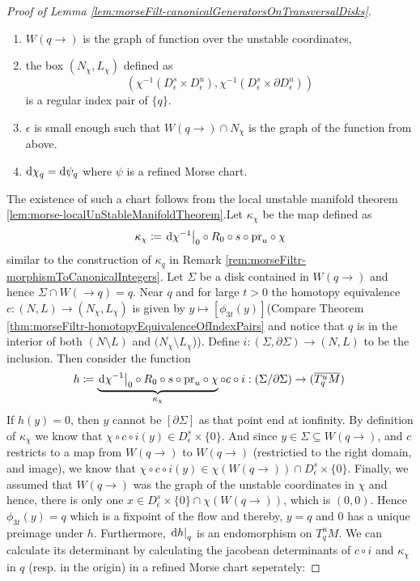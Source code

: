\begin{proof}[Proof of Lemma \ref{lem:morseFilt-canonicalGeneratorsOnTransversalDisks}]
	\begin{enumerate}
		\item $W(q\to)$ is the graph of function over the unstable coordinates,
		\item the box $(N_\chi,L_\chi)$ defined as 
	\begin{equation*}
		(\chi^{-1}(D^s_{\epsilon}\times D^u_{\epsilon}), \chi^{-1}(D^s_{\epsilon}\times \partial D^u_{\epsilon}))
	\end{equation*} is a regular index pair of $\{q\}$.
		\item $\epsilon$ is small enough such that $W(q\to)\cap N_\chi$ is the graph of the function from above.
		\item $\mathop{}\!\mathrm{d} \chi_q=\mathop{}\!\mathrm{d} \psi_q$ where $\psi$ is a refined Morse chart.
	\end{enumerate}
	 The existence of such a chart follows from the local unstable manifold theorem \ref{lem:morse-localUnStableManifoldTheorem}.Let  $\kappa_{\chi}$ be the map defined as 
	 \begin{equation*}
		\kappa_{\chi} \coloneq  \left.\mathop{}\!\mathrm{d} \chi^{-1}\right|_{0}\circ R_0\circ s\circ \mathrm{pr}_u\circ \chi
	 \end{equation*} similar to the construction of $\kappa_q$ in Remark \ref{rem:morseFiltr-morphismToCanonicalIntegers}. Let $\Sigma$ be a disk contained in $W(q\to)$ and hence $\Sigma \cap W(\to q)=q$. Near $q$ and for large $t>0$ the homotopy equivalence $c:(N,L) \to (N_\chi,L_\chi)$ is given by $y\mapsto[\phi_{3t}(y)]$(Compare Theorem \ref{thm:morseFiltr-homotopyEquivalenceOfIndexPairs} and notice that $q$ is in the interior of both $(N\setminus L)$ and $(N_\chi\setminus L_\chi$)). Define $i:(\Sigma,\partial \Sigma) \to (N,L)$ to be the inclusion. 
	 Then consider the function 
	 \begin{equation*}
	 h\coloneq \underbrace{\left.\mathop{}\!\mathrm{d} \chi^{-1}\right|_{0}\circ R_0\circ s\circ \mathrm{pr}_u\circ \chi}_{\kappa_\chi}\circ c\circ i: (\Sigma /\partial \Sigma)\to (\overline{T^u_qM})\,
	 \end{equation*} If $h(y)=0$, then $y$ cannot be $[\partial \Sigma]$ as that point end at ionfinity. 
	 By definition of $\kappa_{\chi}$ we know that $\chi\circ c\circ i(y)\in D^s_\epsilon \times \{0\}$. 
	 And since $y\in \Sigma\subseteq W(q\to)$, and $c$ restricts to a map from $W(q\to)$ to $W(q\to)$ (restrictied to the right domain, and image), we know that $\chi\circ c \circ i(y)\in \chi(W(q\to))\cap D^s_\epsilon \times \{0\}$. 
	 Finally, we assumed that $W(q\to)$ was the graph of the unstable coordinates in $\chi$ and hence, there is only one $x\in D^s_\epsilon \times \{0\}\cap \chi(W(q\to))$, which is $(0,0)$. Hence $\phi_{3t}(y)=q$ which is a fixpoint of the flow and thereby, $y=q$ and $0$ has a unique preimage under $h$. Furthermore, $\left.\mathop{}\!\mathrm{d} h\right|_{q}$ is an endomorphism on $T^u_qM$. We can calculate its determinant by calculating the jacobean determinants of $c\circ i$ and $\kappa_\chi$ in $q$ (resp. in the origin) in a refined Morse chart seperately: 

\end{proof}

